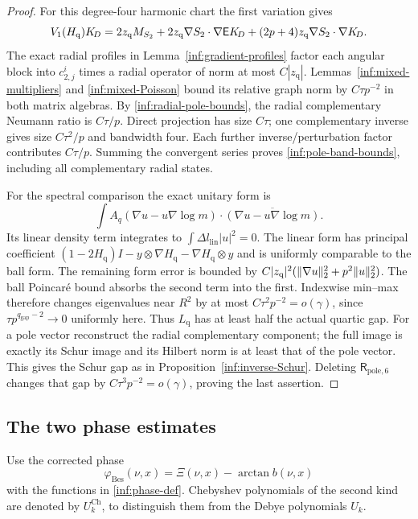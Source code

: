 \begin{proof}
For this degree-four harmonic chart the first variation gives
\[
 V_1(H_{\mathrm q})K_{\!D}
 =2z_{\mathrm q}M_{S_2}
 +2z_{\mathrm q}\nabla S_2\cdot\nabla\mathsf EK_{\!D}
 +(2p+4)z_{\mathrm q}\nabla S_2\cdot\nabla K_{\!D}.
\]
The exact radial profiles in Lemma~\ref{inf:gradient-profiles}
factor each angular block into $c_{2,j}^i$ times a radial operator
of norm at most $C|z_{\mathrm q}|$.
Lemmas~\ref{inf:mixed-multipliers} and \ref{inf:mixed-Poisson}
bound its relative graph norm by $C\tau p^{-2}$ in both matrix
algebras. By \eqref{inf:radial-pole-bounds}, the radial complementary
Neumann ratio is $C\tau/p$. Direct projection has size $C\tau$;
one complementary inverse gives size $C\tau^2/p$ and bandwidth four.
Each further inverse/perturbation factor contributes $C\tau/p$.
Summing the convergent series proves \eqref{inf:pole-band-bounds},
including all complementary radial states.

For the spectral comparison the exact unitary form is
\[
 \int A_q(\nabla u-u\nabla\log m)\cdot
                  \overline{(\nabla u-u\nabla\log m)}.
\]
Its linear density term integrates to
$\int\Delta l_{\mathrm{lin}}|u|^2=0$.
The linear form has principal coefficient
$(1-2H_{\mathrm q})I-y\otimes\nabla H_{\mathrm q}
-\nabla H_{\mathrm q}\otimes y$ and is uniformly comparable
to the ball form. The remaining form error
is bounded by
$C|z_{\mathrm q}|^2(\lVert \nabla u\rVert_2^2+p^2\lVert u\rVert_2^2)$.
The ball Poincar\'e bound absorbs the second term into the first.
Indexwise min--max therefore changes eigenvalues near $R^2$ by at most
$C\tau^2p^{-2}=o(\gamma)$, since
$\tau p^{q_{\mathrm{gap}}-2}\to0$ uniformly here.
Thus $L_{\mathrm q}$ has at least half the actual quartic gap.
For a pole vector reconstruct the radial complementary component;
the full image is exactly its Schur image and its Hilbert norm
is at least that of the pole vector. This gives the Schur gap as
in Proposition~\ref{inf:inverse-Schur}.
Deleting $\mathsf R_{\mathrm{pole},6}$ changes that gap by
$C\tau^3p^{-2}=o(\gamma)$, proving the last assertion.
\end{proof}

\subsection{The two phase estimates}

Use the corrected phase
\begin{equation}\label{inf:corrected-phase}
 \varphi_{\mathrm{Bes}}(\nu,x)=\Xi(\nu,x)-\arctan b(\nu,x)
\end{equation}
with the functions in \eqref{inf:phase-def}. Chebyshev polynomials
of the second kind are denoted by $U_k^{\mathrm{Ch}}$, to distinguish
them from the Debye polynomials $U_k$.


